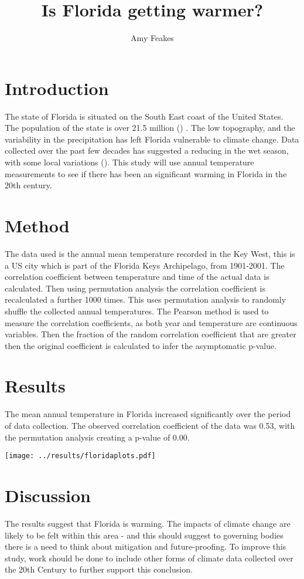 \documentclass[a4paper]{article}
\title{Is Florida getting warmer?}
\author{Amy Feakes}
\begin{document}
\maketitle

\section{Introduction}

The state of Florida is situated on the South East coast of the United States. The population of the state is over 21.5 million (\cite{census}) . The low topography, and the variability in the precipitation has left Florida vulnerable to climate change. Data collected over the past few decades has suggested a reducing in the wet season, with some local variations (\cite{temp}). This study will use annual temperature measurements to see if there has been an significant warming in Florida in the 20th century. 

\section{Method}

The data used is the annual mean temperature recorded in the Key West, this is a US city which is part of the Florida Keys Archipelago, from 1901-2001. The correlation coefficient between temperature and time of the actual data is calculated. Then using permutation analysis the correlation coefficient is recalculated a further 1000 times. This uses permutation analysis to randomly shuffle the collected annual temperatures. The Pearson method is used to measure the correlation coefficients, as both year and temperature are continuous variables. Then the fraction of the random correlation coefficient that are greater then the original coefficient is calculated to infer the asymptomatic p-value. 

\section{Results}

The mean annual temperature in Florida increased significantly over the period of data collection. The observed correlation coefficient of the data was 0.53, with the permutation analysis creating a p-value of 0.00. 

\texttt{[image: ../results/floridaplots.pdf]}

\section{Discussion}

The results suggest that Florida is warming. The impacts of climate change are likely to be felt within this area - and this should suggest to governing bodies there is a need to think about mitigation and future-proofing. To improve this study, work should be done to include other forms of climate data collected over the 20th Century to further support this conclusion. 




\end{document}
